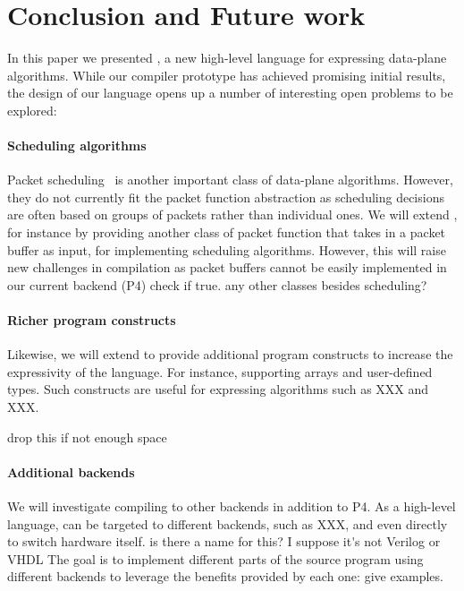 \section{Conclusion and Future work}

%
%
\label{s:future}

In this paper we presented \pktlanguage, a new high-level language for expressing 
data-plane
algorithms. While our compiler prototype has achieved promising initial results, 
the design of our language opens up 
a number of interesting open problems to be explored:

\paragraph{Scheduling algorithms}
Packet scheduling~\cite{XXX, XXX} is another important class of data-plane algorithms.
However, they do not currently fit the \pktlanguage packet function abstraction
as scheduling decisions are often based on groups of packets rather than individual
ones. We will extend \pktlanguage, for instance by providing another class of packet
function that takes in a packet buffer as input, for implementing scheduling algorithms.
However, this will raise new challenges in compilation as packet buffers cannot be
easily implemented in our current backend (P4) \ac{check if true}.
\ac{any other classes besides scheduling?}

\paragraph{Richer program constructs}
Likewise, we will extend \pktlanguage to provide additional program constructs
to increase the expressivity of the language. For instance, supporting 
arrays and user-defined types. Such constructs are useful for expressing 
algorithms such as XXX and XXX.

\ac{drop this if not enough space}
\paragraph{Additional backends}
We will investigate compiling \pktlanguage to other backends in addition to P4. 
As a high-level language, \pktlanguage can be targeted to different backends, 
such as XXX, and even directly 
to switch hardware itself. \ac{is there a name for this? I suppose
it's not Verilog or VHDL} The goal is to implement different parts of the source 
program using different backends to leverage the benefits provided by each one:
\ac{give examples}.


